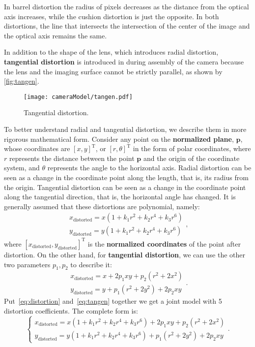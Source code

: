 In barrel distortion the radius of pixels decreases as the distance from the optical axis increases, while the cushion distortion is just the opposite. In both distortions, the line that intersects the intersection of the center of the image and the optical axis remains the same.

In addition to the shape of the lens, which introduces radial distortion, \textbf{tangential distortion} is introduced in during assembly of the camera because the lens and the imaging surface cannot be strictly parallel, as shown by \autoref{fig:tangen}.

\begin{figure}[!t]
	\centering
	\texttt{[image: cameraModel/tangen.pdf]}
	\caption{Tangential distortion.}
	\label{fig:tangen}
\end{figure}

To better understand radial and tangential distortion, we describe them in more rigorous mathematical form. Consider any point on the \textbf{normalized plane}, $\mathbf{p}$, whose coordinates are $[x,y]^\mathrm{T}$, or $[r, \theta]^\mathrm{T}$ in the form of polar coordinates, where $r$ represents the distance between the point $\mathbf{p}$ and the origin of the coordinate system, and $\theta$ represents the angle to the horizontal axis. Radial distortion can be seen as a change in the coordinate point along the length, that is, its radius from the origin. Tangential distortion can be seen as a change in the coordinate point along the tangential direction, that is, the horizontal angle has changed. It is generally assumed that these distortions are polynomial, namely:
\begin{equation}
\label{eq:distortion} 
\begin{matrix}
x_\mathrm{distorted} = x(1+k_1r^2+k_2r^4+k_3r^6)\\
y_\mathrm{distorted} = y(1+k_1r^2+k_2r^4+k_3r^6)
\end{matrix},
\end{equation}
where $[x_\mathrm{distorted}, y_\mathrm{distorted}]^\mathrm{T}$ is the \textbf{normalized coordinates} of the point after distortion. On the other hand, for \textbf{tangential distortion}, we can use the other two parameters $p_1,p_2$ to describe it:
\begin{equation}
\label{eq:tangen} 
\begin{matrix}
x_\mathrm{distorted} = x+2p_1xy+p_2(r^2+2x^2)\\
y_\mathrm{distorted} = y+p_1(r^2+2y^2)+2p_2xy
\end{matrix}. 
\end{equation}
Put~\eqref{eq:distortion} and~\eqref{eq:tangen} together we get a joint model with 5 distortion coefficients. The complete form is:
\begin{equation}
\left\{\begin{matrix} x_\mathrm{distorted} =x(1+k_1r^2+k_2r^4+k_3r^6)+2p_1xy+p_2(r^2+2x^2)\\ 
y_\mathrm{distorted} = y(1+k_1r^2+k_2r^4+k_3r^6)+p_1(r^2+2y^2)+2p_2xy
\end{matrix}\right. .
\end{equation}

